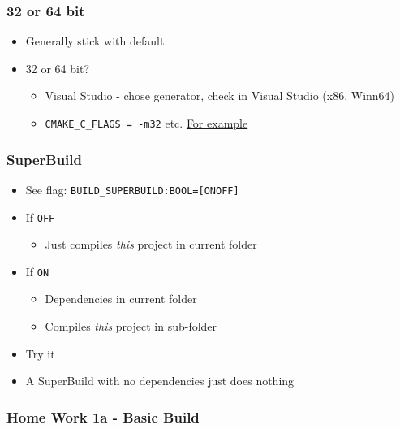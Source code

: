 \subsubsection{32 or 64 bit}\label{or-64-bit}

\begin{itemize}
\itemsep1pt\parskip0pt
\item
  Generally stick with default
\item
  32 or 64 bit?

  \begin{itemize}
  \itemsep1pt\parskip0pt
  \item
    Visual Studio - chose generator, check in Visual Studio (x86,
    Winn64)
  \item
    \texttt{CMAKE\_C\_FLAGS = -m32} etc.
    \href{https://unix.stackexchange.com/questions/352783/how-can-i-build-and-run-32-bit-software-on-64-bit-debian}{For
    example}
  \end{itemize}
\end{itemize}

\subsubsection{SuperBuild}\label{superbuild}

\begin{itemize}
\itemsep1pt\parskip0pt
\item
  See flag: \texttt{BUILD\_SUPERBUILD:BOOL={[}ON\textbar{}OFF{]}}
\item
  If \texttt{OFF}

  \begin{itemize}
  \itemsep1pt\parskip0pt
  \item
    Just compiles \emph{this} project in current folder
  \end{itemize}
\item
  If \texttt{ON}

  \begin{itemize}
  \itemsep1pt\parskip0pt
  \item
    Dependencies in current folder
  \item
    Compiles \emph{this} project in sub-folder
  \end{itemize}
\item
  Try it
\item
  A SuperBuild with no dependencies just does nothing
\end{itemize}

\subsubsection{Home Work 1a - Basic
Build}\label{home-work-1a---basic-build}

